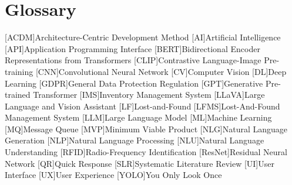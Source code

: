 \chapter{Glossary}

\footnotesize
\DoubleSpacing

\begin{multicols}{2}
\begin{acronym}[ai]
	[ACDM]{Architecture-Centric Development Method}
	[AI]{Artificial Intelligence}
	[API]{Application Programming Interface}
	[BERT]{Bidirectional Encoder Representations from Transformers}
	[CLIP]{Contrastive Language-Image Pre-training}
	[CNN]{Convolutional Neural Network}
	[CV]{Computer Vision}
	[DL]{Deep Learning}
	[GDPR]{General Data Protection Regulation}
	[GPT]{Generative Pre-trained Transformer}
	[IMS]{Inventory Management System}
	[LLaVA]{Large Language and Vision Assistant}
	[LF]{Lost-and-Found}
	[LFMS]{Lost-And-Found Management System}
	[LLM]{Large Language Model}
	[ML]{Machine Learning}
	[MQ]{Message Queue}
	[MVP]{Minimum Viable Product}
	[NLG]{Natural Language Generation}
	[NLP]{Natural Language Processing}
	[NLU]{Natural Language Understanding}
	[RFID]{Radio-Frequency Identification}
	[ResNet]{Residual Neural Network}
	[QR]{Quick Response}
	[SLR]{Systematic Literature Review}
	[UI]{User Interface}
	[UX]{User Experience}
	[YOLO]{You Only Look Once}
\end{acronym}
\end{multicols}

